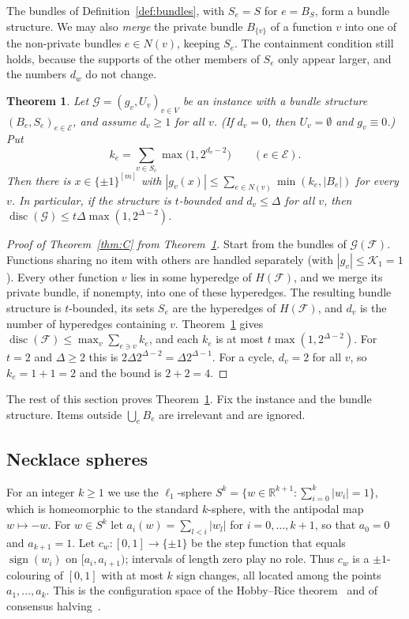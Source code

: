 \documentclass[11pt,letterpaper]{article}
\newtheorem{theorem}{Theorem}[section]
\theoremstyle{definition}
\newcommand{\R}{\mathbb{R}}
\newcommand{\cF}{\mathcal{F}}
\newcommand{\cG}{\mathcal{G}}
\newcommand{\cE}{\mathcal{E}}
\newcommand{\cube}[1]{\{\pm1\}^{#1}}
\DeclareMathOperator{\disc}{disc}
\begin{document}
The bundles of Definition~\ref{def:bundles}, with $S_e=S$ for $e=B_S$, form a bundle structure.
We may also \emph{merge} the private bundle $B_{\{v\}}$ of a function $v$ into one of the
non-private bundles $e\in N(v)$, keeping $S_e$. The containment condition still holds, because
the supports of the other members of $S_e$ only appear larger, and the numbers $d_w$ do not
change.

\begin{theorem}\label{thm:Cinst}
Let $\cG=(g_v,U_v)_{v\in V}$ be an instance with a bundle structure $(B_e,S_e)_{e\in\cE}$, and
assume $d_v\ge1$ for all $v$. (If $d_v=0$, then $U_v=\emptyset$ and $g_v\equiv0$.) Put
\[
  k_e=\sum_{v\in S_e}\max\bigl(1,2^{d_v-2}\bigr)\qquad(e\in\cE).
\]
Then there is $x\in\cube{[m]}$ with $|g_v(x)|\le\sum_{e\in N(v)}\min(k_e,|B_e|)$ for every $v$. In
particular, if the structure is $t$-bounded and $d_v\le\Delta$ for all $v$, then $\disc(\cG)\le
t\Delta\max(1,2^{\Delta-2})$.
\end{theorem}

\begin{proof}[Proof of Theorem~\ref{thm:C} from Theorem~\ref{thm:Cinst}]
Start from the bundles of $\cG(\cF)$. Functions sharing no item with others are handled separately
(with $|g_v|\le \mathcal{K}_1=1$). Every other function $v$ lies in some hyperedge of $H(\cF)$, and we merge
its private bundle, if nonempty, into one of these hyperedges. The resulting bundle structure is
$t$-bounded, its sets $S_e$ are the hyperedges of $H(\cF)$, and $d_v$ is the number of hyperedges
containing $v$. Theorem~\ref{thm:Cinst} gives $\disc(\cF)\le\max_v\sum_{e\ni v}k_e$, and each $k_e$
is at most $t\max(1,2^{\Delta-2})$. For $t=2$ and $\Delta\ge2$ this is
$2\Delta2^{\Delta-2}=\Delta2^{\Delta-1}$. For a cycle, $d_v=2$ for all $v$, so $k_e=1+1=2$ and the
bound is $2+2=4$.
\end{proof}

The rest of this section proves Theorem~\ref{thm:Cinst}. Fix the instance and the bundle
structure. Items outside $\bigcup_eB_e$ are irrelevant and are ignored.

\subsection{Necklace spheres}

For an integer $k\ge1$ we use the $\ell_1$-sphere
$S^k=\{w\in\R^{k+1}:\sum_{i=0}^k|w_i|=1\}$, which is homeomorphic to the standard $k$-sphere,
with the antipodal map $w\mapsto-w$. For $w\in S^k$ let $a_i(w)=\sum_{l<i}|w_l|$ for
$i=0,\dots,k+1$, so that $a_0=0$ and $a_{k+1}=1$. Let $c_w\colon[0,1]\to\{\pm1\}$ be the
step function that equals $\operatorname{sign}(w_i)$ on $[a_i,a_{i+1})$; intervals of length zero
play no role. Thus $c_w$ is a $\pm1$-colouring of $[0,1]$ with at most $k$ sign changes, all
located among the points $a_1,\dots,a_k$. This is the configuration space of the Hobby--Rice
theorem~\cite{HR65,Pin76} and of consensus halving~\cite{SS03}.
\end{document}
